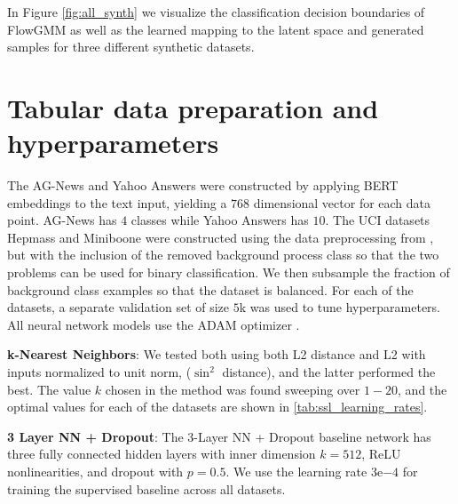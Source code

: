 \documentclass{article}
\newcommand{\method}{FlowGMM\xspace}
\begin{document}
\begin{figure*}
{\begin{tikzpicture}
\end{tikzpicture}
}
\caption{
        Illustration of \method on synthetic datasets: 
        two circles (top row), eight Gaussians (middle row) and pinwheel (bottom row).
        \textbf{(a):} Data distribution and classification decision boundaries. Unlabeled data are shown with blue circles and labeled data are shown with colored triangles, where color represents the class. Background color visualizes the classification decision boundaries of \method.
        \textbf{(b):} Mapping of the data to the latent space.
        \textbf{(c):} Gaussian mixture in the latent space.
        \textbf{(d):} Samples from the learned generative model corresponding to different classes, as shown by their color.
    }
	\label{fig:all_synth}
    \vspace{-.5cm}
\end{figure*}

In Figure \ref{fig:all_synth} we visualize the classification decision boundaries of \method as well as the learned mapping to the latent space and generated samples for three different synthetic datasets. 

\section{Tabular data preparation and hyperparameters}\label{sec:tabulardetails}
The AG-News and Yahoo Answers were constructed by applying BERT embeddings to the text input, yielding a $768$ dimensional vector for each data point. AG-News has $4$ classes while Yahoo Answers has $10$. The UCI datasets Hepmass and Miniboone were constructed using the data preprocessing from \citet{papamakarios2017masked}, but with the inclusion of the removed background process class so that the two problems can be used for binary classification. We then subsample the fraction of background class examples so that the dataset is balanced. For each of the datasets, a separate validation set of size $5$k was used to tune hyperparameters. All neural network models use the ADAM optimizer \citep{kingma2014adam}. 

\textbf{k-Nearest Neighbors}: We tested both using both L2 distance and L2 with inputs normalized to unit norm, ($\sin^2$ distance), and the latter performed the best. The value $k$ chosen in the method was found sweeping over $1-20$, and the optimal values for each of the datasets are shown in \ref{tab:ssl_learning_rates}.

\textbf{3 Layer NN + Dropout}: The $3$-Layer NN + Dropout baseline network has three fully connected hidden layers with inner dimension $k=512$, \textrm{ReLU} nonlinearities, and dropout with $p=0.5$. We use the learning rate $3$e$-4$ for training the supervised baseline across all datasets.
\end{document}
